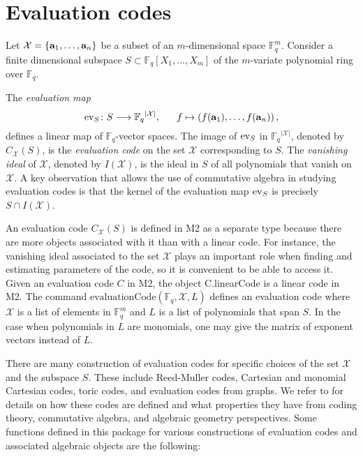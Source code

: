 \documentclass[12pt]{amsart}
\theoremstyle{plain}
\begin{document}
\section{Evaluation codes}\label{eva}
Let $\mathcal{X}=\left\{{\bf a}_1,\ldots,{\bf a}_n\right\}$ be a subset of an $m$-dimensional space $\mathbb{F}_q^{m}$.
Consider a finite dimensional subspace $S\subset {\mathbb{F}_q}[X_1,\ldots,X_m]$  of the $m$-variate polynomial ring over $\mathbb{F}_q$.

The {\it evaluation map\/}
\begin{equation*}\label{functionevaluation}
{\rm ev}_S\colon S\longrightarrow {\mathbb{F}_q}^{|\mathcal{X}|},\ \ \ \ \ 
f\mapsto \left(f({\bf a}_1),\ldots,f({\bf a}_n)\right),
\end{equation*}
defines a linear map of ${\mathbb{F}_q}$-vector spaces. The image of ${\rm ev}_S$ in ${\mathbb{F}_q}^{|\mathcal{X}|}$, denoted by $C_{\mathcal{X}}(S)$, %
is the {\it evaluation code\/} on the set $\mathcal{X}$ corresponding to $S$. The {\it vanishing ideal} of $\mathcal{X}$, denoted by $I(\mathcal{X})$, is the ideal in $S$ of all polynomials that vanish on  $\mathcal{X}.$ A key observation that allows the use of commutative algebra in studying evaluation codes is that the kernel of the evaluation map ${\rm ev}_S$ is precisely $S\cap I(\mathcal{X})$.

An evaluation code $C_{\mathcal{X}}(S)$ is defined in M2 as a separate type because there are more objects associated with it than with a linear code. For instance, the vanishing ideal associated to the set $\mathcal{X}$ plays an important role when finding and estimating parameters of the code, so it is convenient to be able to access it. Given an evaluation code $C$ in M2, the object C.linearCode is a linear code in M2. The command $\text{evaluationCode}(\mathbb{F}_q,\mathcal{X},L)$ defines an evaluation code where $\mathcal{X}$ is a list of elements in $\mathbb{F}_q^{m}$ and $L$ is a list of polynomials that span $S$. In the case when polynomials in $L$ are monomials, one may give the matrix of exponent vectors instead of $L$. 

There are many construction of evaluation codes for specific choices of the set $\mathcal{X}$ and the subspace $S$. These include
Reed-Muller codes, Cartesian and monomial Cartesian codes, toric codes, and evaluation codes from graphs. We refer to 
\cite{carvalho4, Ha1, LSc, lopez-villa, MPV, algcodes, Ru, SoSo} for details on how these codes are defined and what properties they have from coding theory, commutative algebra, and algebraic geometry perspectives. Some functions defined in this package for various constructions of evaluation codes and associated algebraic objects are the following:
\end{document}
